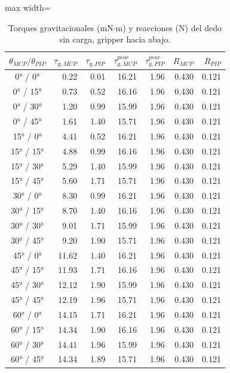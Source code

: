 \begin{table}[H]
\centering
\small
\begin{adjustbox}{max width=\textwidth}
\begin{tabular}{|c|r|r|r|r|r|r|}
\hline
\textbf{$\theta_{MCP}/\theta_{PIP}$} & \textbf{$\tau_{g,MCP}$} & \textbf{$\tau_{g,PIP}$} & \textbf{$\tau_{g,MCP}^{peor}$} & \textbf{$\tau_{g,PIP}^{peor}$} & \textbf{$R_{MCP}$} & \textbf{$R_{PIP}$} \\ \hline
0° / 0° & 0.22 & 0.01 & 16.21 & 1.96 & 0.430 & 0.121 \\ \hline
0° / 15° & 0.73 & 0.52 & 16.16 & 1.96 & 0.430 & 0.121 \\ \hline
0° / 30° & 1.20 & 0.99 & 15.99 & 1.96 & 0.430 & 0.121 \\ \hline
0° / 45° & 1.61 & 1.40 & 15.71 & 1.96 & 0.430 & 0.121 \\ \hline
15° / 0° & 4.41 & 0.52 & 16.21 & 1.96 & 0.430 & 0.121 \\ \hline
15° / 15° & 4.88 & 0.99 & 16.16 & 1.96 & 0.430 & 0.121 \\ \hline
15° / 30° & 5.29 & 1.40 & 15.99 & 1.96 & 0.430 & 0.121 \\ \hline
15° / 45° & 5.60 & 1.71 & 15.71 & 1.96 & 0.430 & 0.121 \\ \hline
30° / 0° & 8.30 & 0.99 & 16.21 & 1.96 & 0.430 & 0.121 \\ \hline
30° / 15° & 8.70 & 1.40 & 16.16 & 1.96 & 0.430 & 0.121 \\ \hline
30° / 30° & 9.01 & 1.71 & 15.99 & 1.96 & 0.430 & 0.121 \\ \hline
30° / 45° & 9.20 & 1.90 & 15.71 & 1.96 & 0.430 & 0.121 \\ \hline
45° / 0° & 11.62 & 1.40 & 16.21 & 1.96 & 0.430 & 0.121 \\ \hline
45° / 15° & 11.93 & 1.71 & 16.16 & 1.96 & 0.430 & 0.121 \\ \hline
45° / 30° & 12.12 & 1.90 & 15.99 & 1.96 & 0.430 & 0.121 \\ \hline
45° / 45° & 12.19 & 1.96 & 15.71 & 1.96 & 0.430 & 0.121 \\ \hline
60° / 0° & 14.15 & 1.71 & 16.21 & 1.96 & 0.430 & 0.121 \\ \hline
60° / 15° & 14.34 & 1.90 & 16.16 & 1.96 & 0.430 & 0.121 \\ \hline
60° / 30° & 14.41 & 1.96 & 15.99 & 1.96 & 0.430 & 0.121 \\ \hline
60° / 45° & 14.34 & 1.89 & 15.71 & 1.96 & 0.430 & 0.121 \\ \hline
\end{tabular}
\end{adjustbox}
\caption{Torques gravitacionales (mN$\cdot$m) y reacciones (N) del dedo sin carga, gripper hacia abajo.}
\label{tab:gravedad}
\end{table}